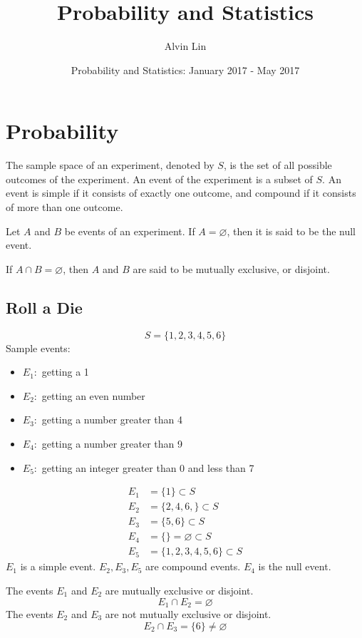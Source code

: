 \documentclass{math}
\title{Probability and Statistics}
\author{Alvin Lin}
\date{Probability and Statistics: January 2017 - May 2017}
\begin{document}
\maketitle

\section*{Probability}
The sample space of an experiment, denoted by \( S \), is the set of all
possible outcomes of the experiment. An event of the experiment is a subset
of \( S \). An event is simple if it consists of exactly one outcome, and
compound if it consists of more than one outcome. \par
Let \( A \) and \( B \) be events of an experiment. If \( A = \varnothing \),
then it is said to be the null event. \par
If \( A \cap B = \varnothing \), then \( A \) and \( B \) are said to be mutually
exclusive, or disjoint.

\subsection*{Roll a Die}
\[ S = \big\{ 1, 2, 3, 4, 5, 6 \big\} \]
Sample events:
\begin{itemize}
  \item \( E_{1}: \) getting a 1
  \item \( E_{2}: \) getting an even number
  \item \( E_{3}: \) getting a number greater than 4
  \item \( E_{4}: \) getting a number greater than 9
  \item \( E_{5}: \) getting an integer greater than 0 and less than 7
\end{itemize}
\begin{align*}
  E_{1} &= \big\{ 1 \big\} \subset S \\
  E_{2} &= \big\{ 2, 4, 6, \big\} \subset S \\
  E_{3} &= \big\{ 5, 6 \big\} \subset S \\
  E_{4} &= \big\{ \big\} = \varnothing \subset S \\
  E_{5} &= \big\{ 1, 2, 3, 4, 5, 6 \big\} \subset S
\end{align*}
\( E_{1} \) is a simple event. \( E_{2}, E_{3}, E_{5} \) are compound events.
\( E_{4} \) is the null event. \par
The events \( E_{1} \) and \( E_{2} \) are mutually exclusive or disjoint.
\[ E_{1} \cap E_{2} = \varnothing \]
The events \( E_{2} \) and \( E_{3} \) are not mutually exclusive or disjoint.
\[ E_{2} \cap E_{3} = \big\{ 6 \big\} \neq \varnothing \]
\end{document}
